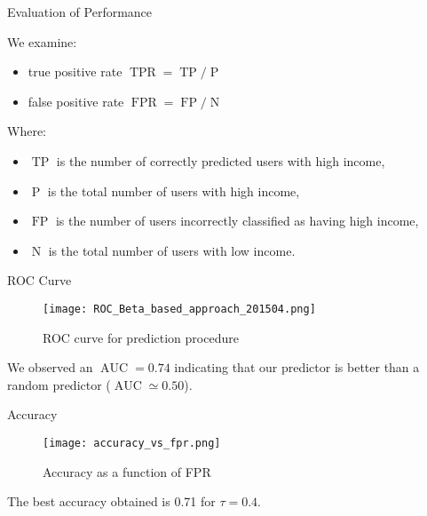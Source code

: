 \documentclass[usenames,dvipsnames]{beamer}
\newcommand{\TP}{\operatorname{TP}}
\newcommand{\FP}{\operatorname{FP}}
\newcommand{\TPR}{\operatorname{TPR}}
\newcommand{\FPR}{\operatorname{FPR}}
\newcommand{\AUC}{\operatorname{AUC}}
\begin{document}
\begin{frame}{Evaluation of Performance}

We examine:
\begin{itemize}
\item true positive rate \( \TPR = \TP / \operatorname{P} \)
\item false positive rate \( \FPR = \FP / \operatorname{N} \)
\end{itemize}
Where:
\begin{itemize}
\item $\TP$ is the number of correctly predicted users with high income,
\item $\operatorname{P}$ is the total number of users with high income, 
\item $\FP$ is the number of users incorrectly classified as having high income,
\item $\operatorname{N}$ is the total number of users with low income.

\end{itemize} 


\end{frame}

\begin{frame}{ROC Curve}

\begin{figure}
\begin{center}
\texttt{[image: ROC\_Beta\_based\_approach\_201504.png]}
\caption{ROC curve for prediction procedure}
\label{ROC_multiclass}
\end{center}
\end{figure}

We observed an $\AUC = 0.74$ indicating that our predictor is better than a random predictor ($\AUC \simeq 0.50$).

\end{frame}


\begin{frame}{Accuracy}

\begin{figure}[p]
\begin{center}
\texttt{[image: accuracy\_vs\_fpr.png]}
\caption{Accuracy as a function of FPR}
\label{fig:accuracy_vs_fpr}
\end{center}
\end{figure}

The best accuracy obtained is \num{0.71} for $\tau = 0.4$.

\end{frame}
\end{document}
